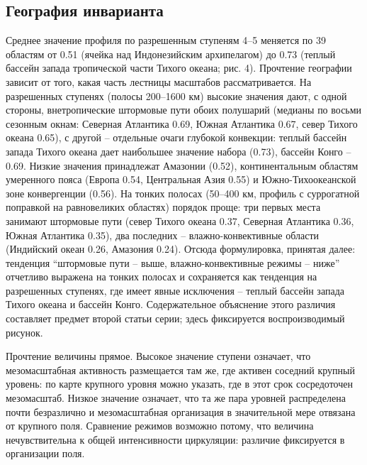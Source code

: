 \documentclass[12pt,a4paper]{article}
\begin{document}
\subsection{География инварианта}

Среднее значение профиля по разрешенным ступеням 4--5 меняется по 39 областям от 0.51 (ячейка над Индонезийским архипелагом) до 0.73 (теплый бассейн запада тропической части Тихого океана; рис. 4). Прочтение географии зависит от того, какая часть лестницы масштабов рассматривается. На разрешенных ступенях (полосы 200--1600 км) высокие значения дают, с одной стороны, внетропические штормовые пути обоих полушарий (медианы по восьми сезонным окнам: Северная Атлантика 0.69, Южная Атлантика 0.67, север Тихого океана 0.65), с другой -- отдельные очаги глубокой конвекции: теплый бассейн запада Тихого океана дает наибольшее значение набора (0.73), бассейн Конго -- 0.69. Низкие значения принадлежат Амазонии (0.52), континентальным областям умеренного пояса (Европа 0.54, Центральная Азия 0.55) и Южно-Тихоокеанской зоне конвергенции (0.56). На тонких полосах (50--400 км, профиль с суррогатной поправкой на равновеликих областях) порядок проще: три первых места занимают штормовые пути (север Тихого океана 0.37, Северная Атлантика 0.36, Южная Атлантика 0.35), два последних -- влажно-конвективные области (Индийский океан 0.26, Амазония 0.24). Отсюда формулировка, принятая далее: тенденция “штормовые пути -- выше, влажно-конвективные режимы -- ниже” отчетливо выражена на тонких полосах и сохраняется как тенденция на разрешенных ступенях, где имеет явные исключения -- теплый бассейн запада Тихого океана и бассейн Конго. Содержательное объяснение этого различия составляет предмет второй статьи серии; здесь фиксируется воспроизводимый рисунок.

Прочтение величины прямое. Высокое значение ступени означает, что мезомасштабная активность размещается там же, где активен соседний крупный уровень: по карте крупного уровня можно указать, где в этот срок сосредоточен мезомасштаб. Низкое значение означает, что та же пара уровней распределена почти безразлично и мезомасштабная организация в значительной мере отвязана от крупного поля. Сравнение режимов возможно потому, что величина нечувствительна к общей интенсивности циркуляции: различие фиксируется в организации поля.
\end{document}
